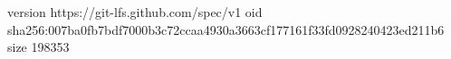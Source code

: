 version https://git-lfs.github.com/spec/v1
oid sha256:007ba0fb7bdf7000b3c72ccaa4930a3663cf177161f33fd0928240423ed211b6
size 198353
